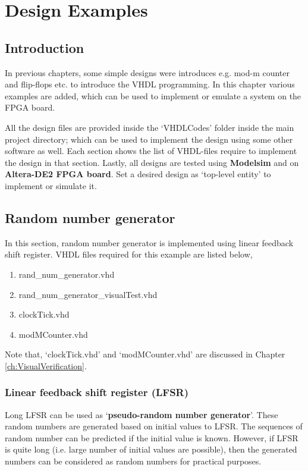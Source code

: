 \chapter{Design Examples} \label{ch:ExamplesBasicDesigns}

\graphicspath{{Chapters/DesignExamples/Figures/}}


%

\section{Introduction}
In previous chapters, some simple designs were introduces e.g. mod-m counter and flip-flops etc. to introduce the VHDL programming. In this chapter various examples are added, which can be used to implement or emulate a system on the FPGA board. 

All the design files are provided inside the `VHDLCodes' folder inside the main project directory; which can be used to implement the design using some other software as well. Each section shows the list of VHDL-files require to implement the design in that section. Lastly, all designs are tested using \textbf{Modelsim} and on \textbf{Altera-DE2 FPGA board}. Set a desired design as `top-level entity' to implement or simulate it. 

\section{Random number generator}
In this section, random number generator is implemented using linear feedback shift register. VHDL files required for this example are listed below, 
\begin{enumerate}
	\item rand\_num\_generator.vhd
	\item rand\_num\_generator\_visualTest.vhd
	\item clockTick.vhd
	\item modMCounter.vhd
\end{enumerate}
Note that, `clockTick.vhd' and `modMCounter.vhd' are discussed in Chapter \ref{ch:VisualVerification}.

\subsection{Linear feedback shift register (LFSR)}
Long LFSR can be used as `\textbf{pseudo-random number generator}'.  These random numbers are generated based on initial values to LFSR. The sequences of random number can be predicted if the initial value is known. However, if LFSR is quite long (i.e. large number of initial values are possible), then the generated numbers can be considered as random numbers for practical purposes.  

